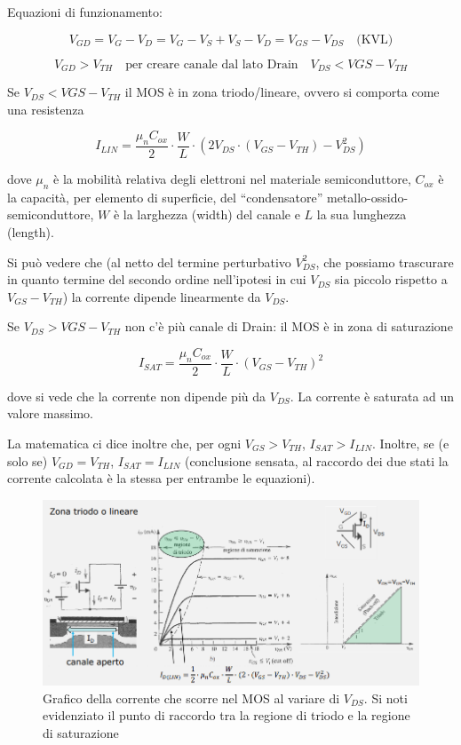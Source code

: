 \documentclass{article}
\begin{document}
Equazioni di funzionamento:

\[V_{GD} = V_G - V_D = V_G - V_S + V_S - V_D = V_{GS} - V_{DS} \quad \textrm {(KVL)}\]

\[V_{GD} > V_{TH} \quad \textrm{per creare canale dal lato Drain} \quad V_{DS} < V{GS} - V_{TH}\]

Se $V_{DS} < V{GS} - V_{TH}$ il MOS è in zona triodo/lineare, ovvero si comporta come una resistenza

\[I_{LIN} = \frac{\mu _n C_{ox}}{2} \cdot \frac{W}{L} \cdot (2V_{DS} \cdot (V_{GS} - V_{TH}) - V_{DS}^2)\]

dove $\mu _n$ è la mobilità relativa degli elettroni nel materiale semiconduttore, $C_{ox}$ è la capacità, per elemento di superficie, del ``condensatore'' metallo-ossido-semiconduttore, $W$ è la larghezza (width) del canale e $L$ la sua lunghezza (length). 

\vspace{1mm}

Si può vedere che (al netto del termine perturbativo $V_{DS}^2$, che possiamo trascurare in quanto termine del secondo ordine nell'ipotesi in cui $V_{DS}$ sia piccolo rispetto a $V_{GS} - V_{TH}$) la corrente dipende linearmente da $V_{DS}$. 

\vspace{3mm}

Se $V_{DS} > V{GS} - V_{TH}$ non c'è più canale di Drain: il MOS è in zona di saturazione

\[I_{SAT} = \frac{\mu _n C_{ox}}{2} \cdot \frac{W}{L} \cdot (V_{GS} - V_{TH})^2\]

dove si vede che la corrente non dipende più da $V_{DS}$. La corrente è saturata ad un valore massimo.

\vspace{3mm}

La matematica ci dice inoltre che, per ogni $V_{GS} > V_{TH}$, $I_{SAT} > I_{LIN}$. Inoltre, se (e solo se) $V_{GD} = V_{TH}$, $I_{SAT} = I_{LIN}$ (conclusione sensata, al raccordo dei due stati la corrente calcolata è la stessa per entrambe le equazioni).

\begin{figure}[h]
  \centering
  \includegraphics[scale=0.7]{IM_MOS_grafici}
  \caption{Grafico della corrente che scorre nel MOS al variare di $V_{DS}$. Si noti evidenziato il punto di raccordo tra la regione di triodo e la regione di saturazione}
  \label{Schema_MOS_grafici}
\end{figure}
\clearpage
\end{document}
